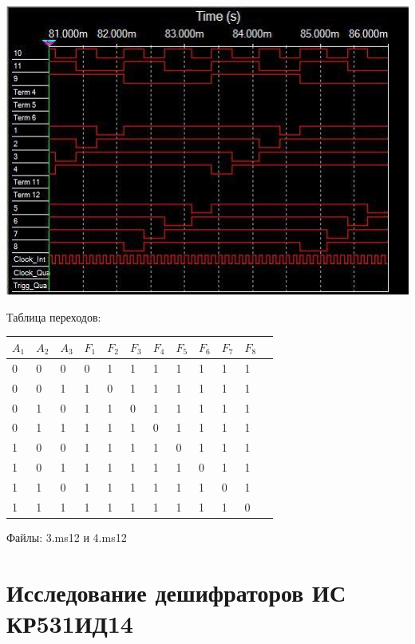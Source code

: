 \documentclass[a4paper,12pt]{article}
\begin{document}
\begin{center}
	\includegraphics[scale=0.9]{../screens/3_2.jpg} \newline
	
	Таблица переходов: 
	
	\begin{center}
		\begin{tabular}{ | l | l | l | l | l | l | l | l | l | l | l | p{1cm} |}
			\hline
			$A_{1}$ & $A_{2}$ & $A_{3}$ & $F_{1}$ & $F_{2}$ & $F_{3}$ & $F_{4}$ & $F_{5}$ & $F_{6}$ & $F_{7}$ & $F_{8}$ \\ \hline
			0 & 0 & 0 & 0 & 1 & 1 & 1 & 1 & 1 & 1 & 1 \\ \hline
			0 & 0 & 1 & 1 & 0 & 1 & 1 & 1 & 1 & 1 & 1 \\ \hline 
			0 & 1 & 0 & 1 & 1 & 0 & 1 & 1 & 1 & 1 & 1 \\ \hline
			0 & 1 & 1 & 1 & 1 & 1 & 0 & 1 & 1 & 1 & 1 \\ \hline
			1 & 0 & 0 & 1 & 1 & 1 & 1 & 0 & 1 & 1 & 1 \\ \hline
			1 & 0 & 1 & 1 & 1 & 1 & 1 & 1 & 0 & 1 & 1 \\ \hline
			1 & 1 & 0 & 1 & 1 & 1 & 1 & 1 & 1 & 0 & 1 \\ \hline
			1 & 1 & 1 & 1 & 1 & 1 & 1 & 1 & 1 & 1 & 0 \\
			\hline
		\end{tabular}
	\end{center}
\end{center}

\noindent Файлы: 3.ms12 и 4.ms12

\section{Исследование дешифраторов ИС КР531ИД14}
\end{document}
